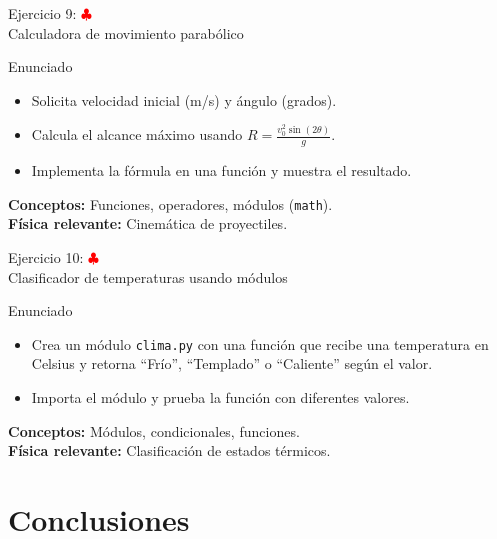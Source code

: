 \documentclass[10pt]{beamer}
\begin{document}
\begin{frame}{Ejercicio 9: \hfill \textcolor{red}{$\clubsuit$} \\ Calculadora de movimiento parabólico}
  \begin{block}{Enunciado}
    \begin{itemize}
      \item Solicita velocidad inicial (m/s) y ángulo (grados).
      \item Calcula el alcance máximo usando \(R = \frac{v_0^2 \sin(2\theta)}{g}\).
      \item Implementa la fórmula en una función y muestra el resultado.
    \end{itemize}
  \end{block}
  \textbf{Conceptos:} Funciones, operadores, módulos (\texttt{math}).\\
  \textbf{Física relevante:} Cinemática de proyectiles.
\end{frame}

\begin{frame}{Ejercicio 10: \hfill \textcolor{red}{$\clubsuit$} \\ Clasificador de temperaturas usando módulos}
  \begin{block}{Enunciado}
    \begin{itemize}
      \item Crea un módulo \texttt{clima.py} con una función que recibe una temperatura en Celsius y retorna “Frío”, “Templado” o “Caliente” según el valor.
      \item Importa el módulo y prueba la función con diferentes valores.
    \end{itemize}
  \end{block}
  \textbf{Conceptos:} Módulos, condicionales, funciones.\\
  \textbf{Física relevante:} Clasificación de estados térmicos.
\end{frame}


\section{Conclusiones}
\end{document}
